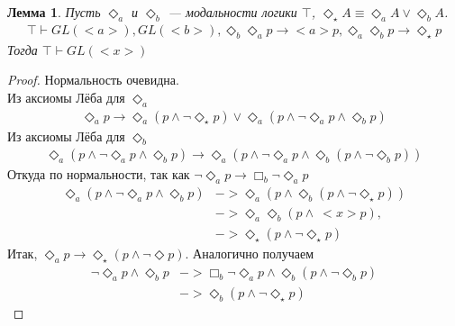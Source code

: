 \documentclass[12pt,a4paper,oneside]{article}
\newtheorem{lemma}{Лемма}
\begin{document}
  \begin{lemma}
    Пусть $\Diamond_a $ и $\Diamond_b $ --- модальности логики $\top $,
    $\Diamond_\star A \equiv \Diamond_a A \vee \Diamond_b A$.
    \begin{align*}
      \top \vdash GL(<a>), GL(<b>), \Diamond_b \Diamond_a p \rightarrow <a>p, \Diamond_a \Diamond_b
      p \rightarrow \Diamond_\star p
    \end{align*}
    Тогда $\top \vdash GL(<x>)$
  \end{lemma}
  \begin{proof}
    Нормальность очевидна. \\ Из аксиомы Лёба для $\Diamond_a $
    \begin{align*}
      \Diamond_a p \rightarrow \Diamond_a (p \wedge \neg \Diamond_\star p) \vee \Diamond_a (p \wedge
      \neg \Diamond_a p \wedge \Diamond_b p)
    \end{align*}
    Из аксиомы Лёба для $\Diamond_b $
    \begin{align*}
      \Diamond_a (p \wedge \neg \Diamond_a p \wedge \Diamond_b p) \rightarrow \Diamond_a (p \wedge
      \neg \Diamond_a p \wedge \Diamond_b (p \wedge \neg \Diamond_b p))
    \end{align*}
    Откуда по нормальности, так как $\neg \Diamond_a p \rightarrow \Box_b
    \neg \Diamond_a p$
    \begin{align*}
      \Diamond_a (p \wedge \neg \Diamond_a p \wedge \Diamond_b p) &-> \Diamond_a (p \wedge
      \Diamond_b (p \wedge \neg \Diamond_\star p))\\
      &-> \Diamond_a \Diamond_b (p \wedge ~<x>p),\\
      &-> \Diamond_\star (p \wedge \neg \Diamond_\star p)
    \end{align*}
    Итак, $\Diamond_a p \rightarrow \Diamond_\star (p \wedge \neg \Diamond p)$.
    Аналогично получаем
    \begin{align*}
      \neg \Diamond_a p \wedge \Diamond_b p &-> \Box_b \neg \Diamond_a p \wedge \Diamond_b (p \wedge
      \neg \Diamond_b p)\\
      &-> \Diamond_b (p \wedge \neg \Diamond_\star p)
    \end{align*}
  \end{proof}
\end{document}
